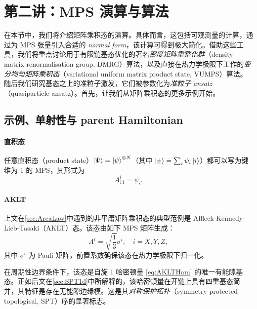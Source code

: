 \section{第二讲：MPS 演算与算法}
在本节中，我们将介绍矩阵乘积态的演算。具体而言，这包括可观测量的计算，通过为 MPS 张量引入合适的 \emph{normal form}，该计算可得到极大简化。借助这些工具，我们将重点讨论用于有限链基态优化的著名\emph{密度矩阵重整化群}（density matrix renormalisation group, DMRG）算法，以及直接在热力学极限下工作的\emph{变分均匀矩阵乘积态}（variational uniform matrix product state, VUMPS）算法。随后我们研究基态之上的准粒子激发，它们被参数化为\emph{准粒子 ansatz}（quasiparticle ansatz）。首先，让我们从矩阵乘积态的更多示例开始。
\subsection{示例、单射性与 parent Hamiltonian}\label{sec:Examples}
\paragraph{直积态} 任意直积态（product state）$\ket{\Psi}=\ket{\psi}^{\otimes N}$（其中 $\ket{\psi}=\sum_i \psi_i\ket{i}$）都可以写为键维为 1 的 MPS，其形式为
\begin{equation}
    A^i_{11} = \psi_i.
\end{equation}
\paragraph{AKLT} 上文在\cref{sec:AreaLaw}中遇到的非平庸矩阵乘积态的典型范例是 Affleck-Kennedy-Lieb-Tasaki（AKLT）态。该态由如下 MPS 矩阵生成：
\begin{equation}\label{eq:AKLTState}
    A^i = \sqrt{\frac{1}{3}}\sigma^i, \quad i=X,Y,Z,
\end{equation}
其中 $\sigma^i$ 为 Pauli 矩阵，前置系数确保该态在热力学极限下归一化。

在周期性边界条件下，该态是自旋 1 哈密顿量 \eqref{eq:AKLTHam} 的唯一有能隙基态。正如后文在\cref{sec:SPT1d}中所解释的，该哈密顿量在开链上具有四重基态简并，其特征是存在无能隙边缘模。这是其\emph{对称保护拓扑}（symmetry-protected topological, SPT）序的显著标志。
